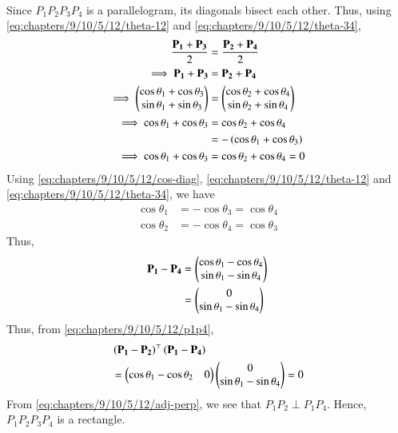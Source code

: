 \documentclass[journal,12pt,twocolumn]{IEEEtran}
\renewcommand{\vec}[1]{\boldsymbol{\mathbf{#1}}}
\begin{document}
\begin{enumerate}
\begin{align}
    \end{align}
    Since $P_1P_2P_3P_4$ is a parallelogram, its diagonals bisect each other. 
    Thus, using \eqref{eq:chapters/9/10/5/12/theta-12} and \eqref{eq:chapters/9/10/5/12/theta-34},
    \begin{align}
        \frac{\vec{P_1}+\vec{P_3}}{2} &= \frac{\vec{P_2}+\vec{P_4}}{2} \\
        \implies \vec{P_1}+\vec{P_3} &= \vec{P_2}+\vec{P_4} \\
        \implies \myvec{\cos\theta_1+\cos\theta_3\\\sin\theta_1+\sin\theta_3} &= \myvec{\cos\theta_2+\cos\theta_4\\\sin\theta_2+\sin\theta_4} \\
        \implies \cos\theta_1+\cos\theta_3 &= \cos\theta_2+\cos\theta_4 \\
                                           &= -\brak{\cos\theta_1+\cos\theta_3} \\
        \implies \cos\theta_1+\cos\theta_3 &= \cos\theta_2+\cos\theta_4 = 0
        \label{eq:chapters/9/10/5/12/cos-diag}
    \end{align}
    Using \eqref{eq:chapters/9/10/5/12/cos-diag}, \eqref{eq:chapters/9/10/5/12/theta-12} and \eqref{eq:chapters/9/10/5/12/theta-34}, we have
    \begin{align}
        \cos\theta_1 &= -\cos\theta_3 = \cos\theta_4 \\
        \cos\theta_2 &= -\cos\theta_4 = \cos\theta_3
        \label{eq:chapters/9/10/5/12/theta-14-23}
    \end{align}
    Thus,
    \begin{align}
        \vec{P_1} - \vec{P_4} &= \myvec{\cos\theta_1-\cos\theta_4\\\sin\theta_1-\sin\theta_4} \\
                              &= \myvec{0\\\sin\theta_1-\sin\theta_4}
                              \label{eq:chapters/9/10/5/12/p1p4}
    \end{align}
    Thus, from \eqref{eq:chapters/9/10/5/12/p1p4},
    \begin{align}
        &\brak{\vec{P_1}-\vec{P_2}}^\top\brak{\vec{P_1}-\vec{P_4}} \nonumber \\
        &= \myvec{\cos\theta_1-\cos\theta_2&0}\myvec{0\\\sin\theta_1-\sin\theta_4} = 0
        \label{eq:chapters/9/10/5/12/adj-perp}
    \end{align}
    From \eqref{eq:chapters/9/10/5/12/adj-perp}, we see that $P_1P_2 \perp P_1P_4$. Hence, $P_1P_2P_3P_4$ is
    a rectangle.


\end{enumerate}
\end{document}
